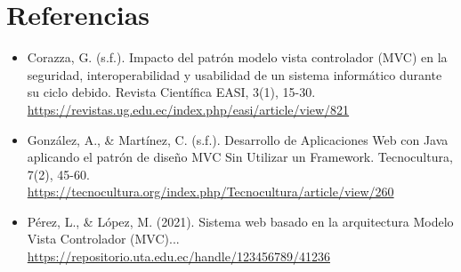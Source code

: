 \documentclass[12pt]{article}
\begin{document}
\section{Referencias}
\begin{itemize}
    \item Corazza, G. (s.f.). Impacto del patrón modelo vista controlador (MVC) en la seguridad, interoperabilidad y usabilidad de un sistema informático durante su ciclo debido. Revista Científica EASI, 3(1), 15-30. \url{https://revistas.ug.edu.ec/index.php/easi/article/view/821}
    \item González, A., \& Martínez, C. (s.f.). Desarrollo de Aplicaciones Web con Java aplicando el patrón de diseño MVC Sin Utilizar un Framework. Tecnocultura, 7(2), 45-60. \url{https://tecnocultura.org/index.php/Tecnocultura/article/view/260}
    \item Pérez, L., \& López, M. (2021). Sistema web basado en la arquitectura Modelo Vista Controlador (MVC)... \url{https://repositorio.uta.edu.ec/handle/123456789/41236}
\end{itemize}
\end{document}
